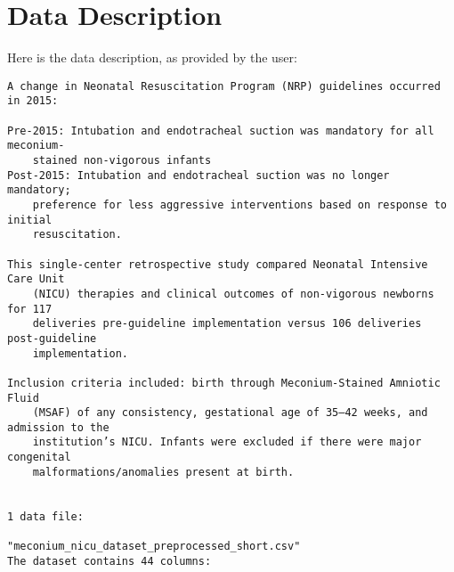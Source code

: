 \documentclass[11pt]{article}
\begin{document}
\clearpage
\appendix

\section{Data Description} \label{sec:data_description} Here is the data description, as provided by the user:

\begin{Verbatim}[tabsize=4]
A change in Neonatal Resuscitation Program (NRP) guidelines occurred in 2015:

Pre-2015: Intubation and endotracheal suction was mandatory for all meconium-
	stained non-vigorous infants
Post-2015: Intubation and endotracheal suction was no longer mandatory;
	preference for less aggressive interventions based on response to initial
	resuscitation.

This single-center retrospective study compared Neonatal Intensive Care Unit
	(NICU) therapies and clinical outcomes of non-vigorous newborns for 117
	deliveries pre-guideline implementation versus 106 deliveries post-guideline
	implementation.

Inclusion criteria included: birth through Meconium-Stained Amniotic Fluid
	(MSAF) of any consistency, gestational age of 35–42 weeks, and admission to the
	institution’s NICU. Infants were excluded if there were major congenital
	malformations/anomalies present at birth.


1 data file:

"meconium_nicu_dataset_preprocessed_short.csv"
The dataset contains 44 columns:


\end{Verbatim}
\end{document}
